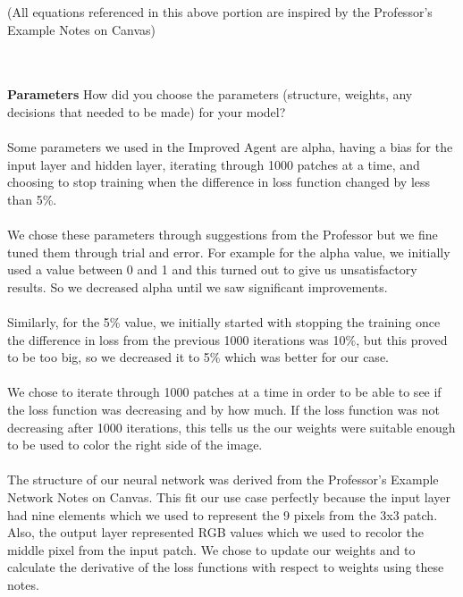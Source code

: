 \documentclass{article}
\theoremstyle{definition}
\begin{document}
        (All equations referenced in this above portion are inspired by the Professor's Example Notes on Canvas)
        
    \\\\
    
    \textbf{Parameters}
        How did you choose the parameters (structure, weights, any decisions that needed to be made) for your model? \\\\
        Some parameters we used in the Improved Agent are alpha, having a bias for the input layer and hidden layer, iterating through 1000 patches at a time, and choosing to stop training when the difference in loss function changed by less than 5\%. \\\\
        We chose these parameters through suggestions from the Professor but we fine tuned them through trial and error. For example for the alpha value, we initially used a value between 0 and 1 and this turned out to give us unsatisfactory results. So we decreased alpha until we saw significant improvements. \\\\
        Similarly, for the 5\% value, we initially started with stopping the training once the difference in loss from the previous 1000 iterations was 10\%, but this proved to be too big, so we decreased it to 5\% which was better for our case. \\\\
        We chose to iterate through 1000 patches at a time in order to be able to see if the loss function was decreasing and by how much. If the loss function was not decreasing after 1000 iterations, this tells us the our weights were suitable enough to be used to color the right side of the image. \\\\
        The structure of our neural network was derived from the Professor's Example Network Notes on Canvas. This fit our use case perfectly because the input layer had nine elements which we used to represent the 9 pixels from the 3x3 patch. Also, the output layer represented RGB values which we used to recolor the middle pixel from the input patch. We chose to update our weights and to calculate the derivative of the loss functions with respect to weights using these notes.
        
\end{document}
